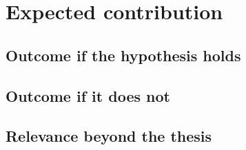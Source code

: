 
\section{Expected contribution}
\label{sec:contribution}


\subsection{Outcome if the hypothesis holds}
\label{sec:outcome-positive}


\subsection{Outcome if it does not}
\label{sec:outcome-negative}


\subsection{Relevance beyond the thesis}
\label{sec:relevance}

